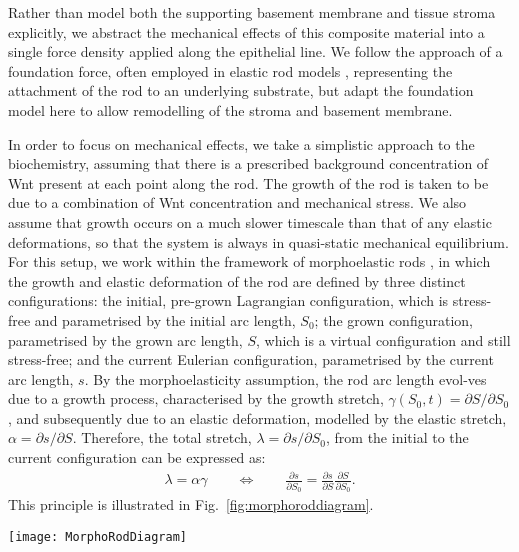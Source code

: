Rather than model both the supporting basement membrane and tissue stroma explicitly, we abstract the mechanical effects of this composite material into a single force density applied along the epithelial line. We follow the approach of a foundation force, often employed in elastic rod models \cite{Edwards2007, Nelson2011, Moulton2013, Chirat2013}, representing the attachment of the rod to an underlying substrate, but adapt the foundation model here to allow remodelling of the stroma and basement membrane.

In order to focus on mechanical effects, we take a simplistic approach to the biochemistry, assuming that there is a prescribed background concentration of Wnt present at each point along the rod. The growth of the rod is taken to be due to a combination of Wnt concentration and mechanical stress. We also assume that growth occurs on a much slower timescale than that of any elastic deformations, so that the system is always in quasi-static mechanical equilibrium. For this setup, we work within the framework of morphoelastic rods \cite{Moulton2013}, in which the growth and elastic deformation of the rod are defined by three distinct configurations: the initial, pre-grown Lagrangian configuration, which is stress-free and parametrised by the initial arc length, $S_0$; the grown configuration, parametrised by the grown arc length, $S$, which is a virtual configuration and still stress-free; and the current Eulerian configuration, parametrised by the current arc length, $s$. %
By the morphoelasticity assumption, the rod arc length evol-ves due to a growth process, characterised by the growth stretch, $\gamma(S_0, t) = \partial S/\partial S_0$, and subsequently due to an elastic deformation, modelled by the elastic stretch, $\alpha = \partial s/\partial S$. Therefore, the total stretch, $\lambda = \partial s/\partial S_0$, from the initial to the current configuration can be expressed as: 
\begin{align}
\lambda = \alpha\gamma \qquad \Longleftrightarrow \qquad  \frac{\partial s}{\partial S_0} = \frac{\partial s}{\partial S}\frac{\partial S}{\partial S_0}.\label{eq:morphoelasticityassumption}
\end{align}
This principle is illustrated in Fig.\ \ref{fig:morphoroddiagram}.
\begin{figure*}[t!]
	\centering
	\texttt{[image: MorphoRodDiagram]}
	\caption{\textbf{The morphoelastic rod approach, applied to the crypt.} The blue region indicates the crypt epithelium, modelled as a growing, elastic rod, while the brown region represents the non-epithelial tissue stroma. Note that by crypt shape symmetry, we need only deformations along the half-interval, from the crypt base to the top. }
	\label{fig:morphoroddiagram}
\end{figure*}

